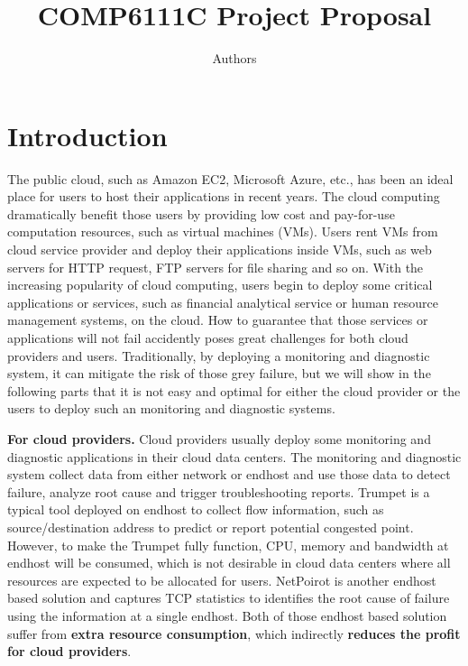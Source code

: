 \documentclass{article}
\title{COMP6111C Project Proposal}
\author{Authors}
\date{}
\begin{document}
\maketitle


\section{Introduction}
The public cloud, such as Amazon EC2\cite{}, Microsoft Azure\cite{}, etc., has been an ideal place for users to host their applications in recent years. The cloud computing dramatically benefit those users by providing low cost and pay-for-use computation resources, such as virtual machines (VMs). Users rent VMs from cloud service provider and deploy their applications inside VMs, such as web servers for HTTP request, FTP servers for file sharing and so on. With the increasing popularity of cloud computing, users begin to deploy some critical applications or services, such as financial analytical service or human resource management systems, on the cloud. How to guarantee that those services or applications will not fail accidently poses great challenges for both cloud providers and users. Traditionally, by deploying a monitoring and diagnostic system, it can mitigate the risk of those grey failure, but we will show in the following parts that it is not easy and optimal for either the cloud provider or the users to deploy such an monitoring and diagnostic systems.

\textbf{For cloud providers.} Cloud providers usually deploy some monitoring and diagnostic applications in their cloud data centers. The monitoring and diagnostic system collect data from either network or endhost and use those data to detect failure, analyze root cause and trigger troubleshooting reports. Trumpet\cite{sigcomm/trumpet} is a typical tool deployed on endhost to collect flow information, such as source/destination address to predict or report potential congested point. However, to make the Trumpet fully function, CPU, memory and bandwidth at endhost will be consumed, which is not desirable in cloud data centers where all resources are expected to be allocated for users. NetPoirot\cite{sigcomm/netpoirot} is another endhost based solution and captures TCP statistics to identifies the root cause of failure using the information at a single endhost. Both of those endhost based solution suffer from \textbf{extra resource consumption}, which indirectly \textbf{reduces the profit for cloud providers}.
\end{document}
